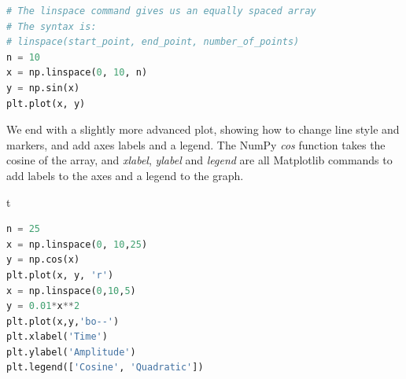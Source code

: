 \documentclass[a4paper , 12pt]{book}
\begin{document}
\begin{center}
\begin{lstlisting}[language=Python, frame=single]
# The linspace command gives us an equally spaced array
# The syntax is: 
# linspace(start_point, end_point, number_of_points)
n = 10
x = np.linspace(0, 10, n)
y = np.sin(x)
plt.plot(x, y)
\end{lstlisting}
\end{center}

We end with a slightly more advanced plot, showing how to change line style and markers, and add axes labels and a legend. The NumPy \textit{cos} function takes the cosine of the array, and \textit{xlabel}, \textit{ylabel} and \textit{legend} are all Matplotlib commands to add labels to the axes and a legend to the graph.

\begin{center} {t}
\begin{lstlisting}[language=Python, frame=single]
n = 25
x = np.linspace(0, 10,25)
y = np.cos(x)
plt.plot(x, y, 'r')
x = np.linspace(0,10,5)
y = 0.01*x**2
plt.plot(x,y,'bo--')
plt.xlabel('Time')
plt.ylabel('Amplitude')
plt.legend(['Cosine', 'Quadratic'])
\end{lstlisting}
\end{center}
\end{document}
